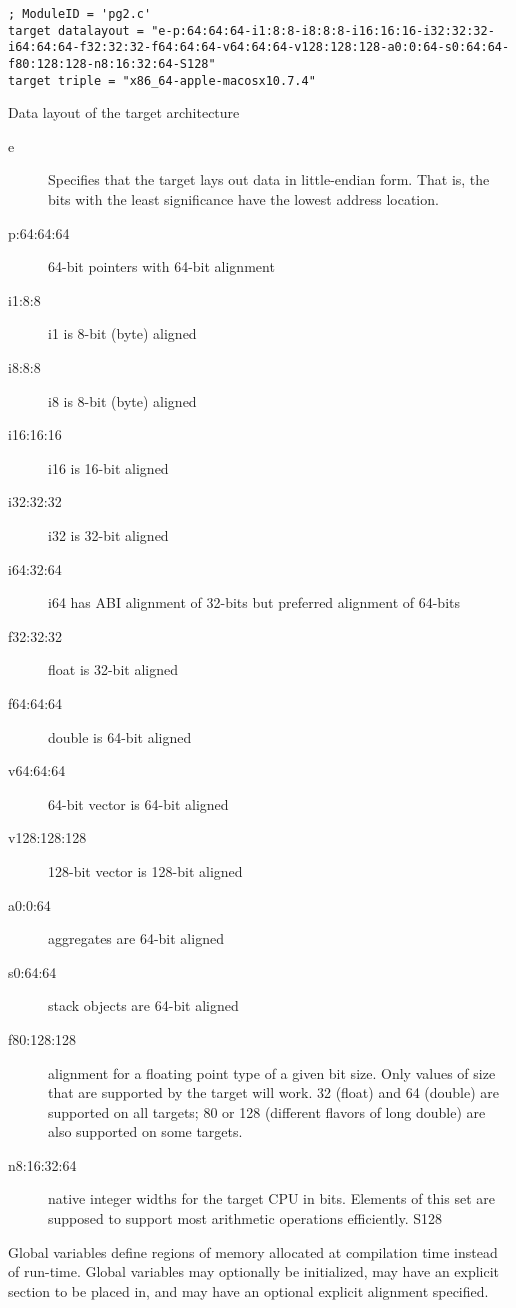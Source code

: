 \begin{verbatim}
; ModuleID = 'pg2.c'
target datalayout = "e-p:64:64:64-i1:8:8-i8:8:8-i16:16:16-i32:32:32-i64:64:64-f32:32:32-f64:64:64-v64:64:64-v128:128:128-a0:0:64-s0:64:64-f80:128:128-n8:16:32:64-S128"
target triple = "x86_64-apple-macosx10.7.4"
\end{verbatim}

Data layout of the target architecture

\begin{description}
\item[e] Specifies that the target lays out data in little-endian form. That is, the bits with the least significance have the lowest address location.
\item[p:64:64:64] 64-bit pointers with 64-bit alignment
\item[i1:8:8] i1 is 8-bit (byte) aligned
\item[i8:8:8] i8 is 8-bit (byte) aligned
\item[i16:16:16] i16 is 16-bit aligned
\item[i32:32:32] i32 is 32-bit aligned
\item[i64:32:64] i64 has ABI alignment of 32-bits but preferred alignment of 64-bits
\item[f32:32:32] float is 32-bit aligned
\item[f64:64:64] double is 64-bit aligned
\item[v64:64:64] 64-bit vector is 64-bit aligned
\item[v128:128:128] 128-bit vector is 128-bit aligned
\item[a0:0:64] aggregates are 64-bit aligned
\item[s0:64:64] stack objects are 64-bit aligned
\item[f80:128:128] alignment for a floating point type of a given bit
  size. Only values of size that are supported by the target will
  work. 32 (float) and 64 (double) are supported on all targets; 80 or
  128 (different flavors of long double) are also supported on some
  targets.
\item[n8:16:32:64] native integer widths for the target CPU in
  bits. Elements of this set are supposed to support most arithmetic
  operations efficiently.  S128
\end{description}

Global variables define regions of memory allocated at compilation
time instead of run-time. Global variables may optionally be
initialized, may have an explicit section to be placed in, and may
have an optional explicit alignment specified. 

